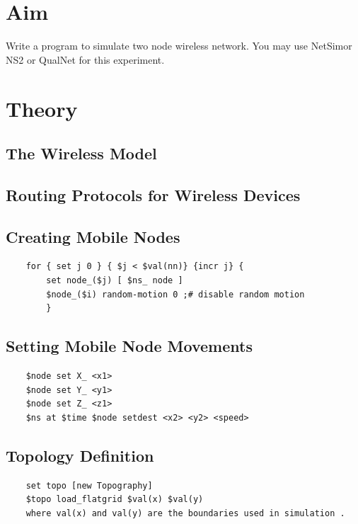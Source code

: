 \documentclass[11pt]{article}
\begin{document}
\tableofcontents
\thispagestyle{empty}
\clearpage

\setcounter{page}{1}

\section{Aim}
Write a program to simulate two node wireless network. You may use NetSimor NS2 or QualNet
for this experiment.

\section{Theory}

\subsection{The Wireless Model}

\subsection{Routing Protocols for Wireless Devices}

\subsection{Creating Mobile Nodes}

\begin{verbatim}
    for { set j 0 } { $j < $val(nn)} {incr j} {
        set node_($j) [ $ns_ node ]
        $node_($i) random-motion 0 ;# disable random motion
        }
\end{verbatim}

\subsection{Setting Mobile Node Movements}

\begin{verbatim}
    $node set X_ <x1>
    $node set Y_ <y1>
    $node set Z_ <z1>
    $ns at $time $node setdest <x2> <y2> <speed>
\end{verbatim}

\subsection{Topology Definition}

\begin{verbatim}
    set topo [new Topography]
    $topo load_flatgrid $val(x) $val(y)
    where val(x) and val(y) are the boundaries used in simulation .
\end{verbatim}
\end{document}
